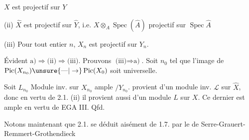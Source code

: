  $X$ est projectif sur $Y$

(ii) $\widehat X$ est projectif sur $\widehat Y$, i.e. $X\otimes_A\operatorname{Spec}(\widehat A)$ projectif sur $\operatorname{Spec}\widehat A$

(iii) Pour tout entier $n$, $X_n$ est projectif sur $Y_n$.

Évident $\text{a)}\Rightarrow\text{(ii)}\Rightarrow\text{(iii)}$. Prouvons $\text{(iii)}\Rightarrow\text{a)}$. Soit $n_0$ tel que l'image de $\operatorname{Pic}(X_{n_0})\unsure{\text{---}|\to}\operatorname{Pic}(X_0)$ soit universelle.

Soit $L_{n_0}$ Module inv. sur $X_{n_0}$ ample $/Y_{n_0}$.   provient d'un module inv. $\mathcal L$ sur $\widehat X$, donc en vertu de  2.1. (ii) il provient aussi d'un module  $L$ sur $X$. Ce dernier est ample en vertu de EGA III. Qfd.


Notons maintenant que 2.1.  se déduit aisément de 1.7. par le  de Serre-Grauert-Remmert-Grothendieck

